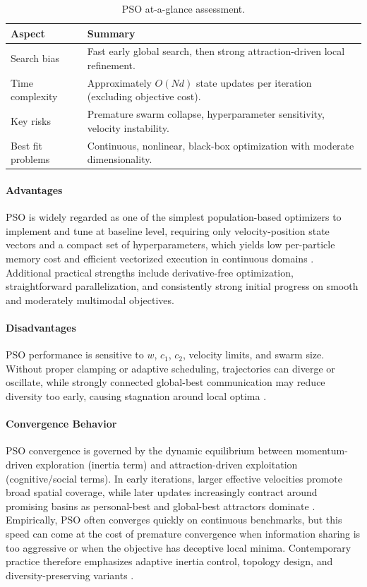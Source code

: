 \begin{table}[H]
\centering
\caption{PSO at-a-glance assessment.}
\label{tab:pso-profile}
\begin{tabular}{p{3.2cm} p{9.3cm}}
\hline
\textbf{Aspect} & \textbf{Summary} \\
\hline
Search bias & Fast early global search, then strong attraction-driven local refinement. \\
Time complexity & Approximately $O(Nd)$ state updates per iteration (excluding objective cost). \\
Key risks & Premature swarm collapse, hyperparameter sensitivity, velocity instability. \\
Best fit problems & Continuous, nonlinear, black-box optimization with moderate dimensionality. \\
\hline
\end{tabular}
\end{table}

\paragraph{Advantages}
PSO is widely regarded as one of the simplest population-based optimizers to implement and tune at baseline level, requiring only velocity-position state vectors and a compact set of hyperparameters, which yields low per-particle memory cost and efficient vectorized execution in continuous domains \autocite{KennedyEberhart1995,WangEtAl2018PSO}. Additional practical strengths include derivative-free optimization, straightforward parallelization, and consistently strong initial progress on smooth and moderately multimodal objectives.

\paragraph{Disadvantages}
PSO performance is sensitive to $w$, $c_1$, $c_2$, velocity limits, and swarm size. Without proper clamping or adaptive scheduling, trajectories can diverge or oscillate, while strongly connected global-best communication may reduce diversity too early, causing stagnation around local optima \autocite{WangEtAl2018PSO}.

\paragraph{Convergence Behavior}
PSO convergence is governed by the dynamic equilibrium between momentum-driven exploration (inertia term) and attraction-driven exploitation (cognitive/social terms). In early iterations, larger effective velocities promote broad spatial coverage, while later updates increasingly contract around promising basins as personal-best and global-best attractors dominate \autocite{KennedyEberhart1995}. Empirically, PSO often converges quickly on continuous benchmarks, but this speed can come at the cost of premature convergence when information sharing is too aggressive or when the objective has deceptive local minima. Contemporary practice therefore emphasizes adaptive inertia control, topology design, and diversity-preserving variants \autocite{WangEtAl2018PSO}.

